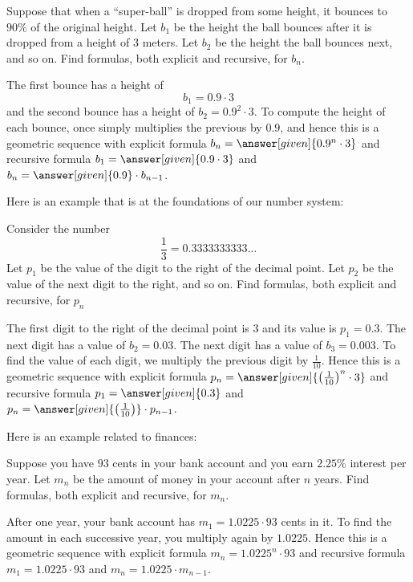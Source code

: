 \documentclass{ximera}
\begin{document}
\begin{example}
  Suppose that when a ``super-ball'' is dropped from some height, it
  bounces to $90\%$ of the original height. Let $b_1$ be the height
  the ball bounces after it is dropped from a height of $3$
  meters. Let $b_2$ be the height the ball bounces next, and so on.
  Find formulas, both explicit and recursive, for $b_n$.
  \begin{explanation}
    The first bounce has a height of
    \[
    b_1 = 0.9\cdot 3
    \]
    and the second bounce has a height of $b_2 = 0.9^2 \cdot 3$. To
    compute the height of each bounce, once simply multiplies the
    previous by $0.9$, and hence this is a geometric sequence with
    explicit formula $b_n = \answer[given]{0.9^n\cdot 3}$ and recursive formula $b_1 =
    \answer[given]{0.9\cdot 3}$ and $b_n = \answer[given]{0.9}\cdot b_{n-1}$.
  \end{explanation}
\end{example}


Here is an example that is at the foundations of our number system:

\begin{example}
  Consider the number
  \[
  \frac{1}{3} = 0.3333333333\dots
  \]
  Let $p_1$ be the value of the digit to the right of the decimal
  point. Let $p_2$ be the value of the next digit to the right, and so
  on. Find formulas, both explicit and recursive, for $p_n$
  \begin{explanation}
    The first digit to the right of the decimal point is $3$ and its
    value is $p_1 = 0.3$. The next digit has a value of $b_2 =
    0.03$. The next digit has a value of $b_3 = 0.003$. To find the
    value of each digit, we multiply the previous digit by
    $\frac{1}{10}$. Hence this is a geometric sequence with explicit
    formula $p_n = \answer[given]{\left(\frac{1}{10}\right)^n\cdot 3}$ and recursive
    formula $p_1 =\answer[given]{0.3}$ and $p_n = \answer[given]{\left(\frac{1}{10}\right)}\cdot
    p_{n-1}$.
  \end{explanation}
\end{example}


Here is an example related to finances:
\begin{example}
  Suppose you have $93$ cents in your bank account and you earn
  $2.25\%$ interest per year. Let $m_n$ be the amount of money in your
  account after $n$ years. Find formulas, both explicit and recursive,
  for $m_n$.
  \begin{explanation}
    After one year, your bank account has $m_1 = 1.0225\cdot 93$ cents
    in it. To find the amount in each successive year, you multiply
    again by $1.0225$. Hence this is a geometric sequence with
    explicit formula $m_n = 1.0225^n\cdot 93$ and recursive formula
    $m_1 =1.0225\cdot 93$ and $m_n = 1.0225\cdot m_{n-1}$.
  \end{explanation}
\end{example}
\end{document}
